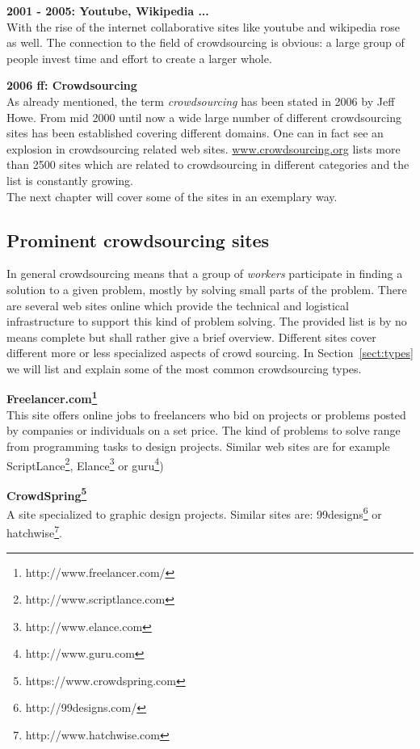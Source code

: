 \documentclass{acm_proc_article-sp}
\begin{document}
\textbf{2001 - 2005: Youtube, Wikipedia ...}\\
With the rise of the internet collaborative sites like youtube and wikipedia rose as well. The connection to the field of crowdsourcing is obvious: a large group of people invest time and effort to create a larger whole.

\textbf{2006 ff: Crowdsourcing}\\
As already mentioned, the term \textit{crowdsourcing} has been stated in 2006 by Jeff Howe. From mid 2000 until now a wide large number of different crowdsourcing sites has been established covering different domains. One can in fact see an explosion in crowdsourcing related web sites. \href{http://www.crowdsourcing.org/directory}{www.crowdsourcing.org} lists more than 2500 sites which are related to crowdsourcing in different categories and the list is constantly growing.\\
The next chapter will cover some of the sites in an exemplary way.

\subsection{Prominent crowdsourcing sites}
In general crowdsourcing means that a group of \textit{workers} participate in finding a solution to a given problem, mostly by solving small parts of the problem. There are several web sites online which provide the technical and logistical infrastructure to support this kind of problem solving. The provided list is by no means complete but shall rather give a brief overview. Different sites cover different more or less specialized aspects of crowd sourcing. In Section~\ref{sect:types} we will list and explain some of the most common crowdsourcing types.

\textbf{Freelancer.com\footnote{http://www.freelancer.com/}}\\
This site offers online jobs to freelancers who bid on projects or problems posted by companies or individuals on a set price. The kind of problems to solve range from programming tasks to design projects. Similar web sites are for example ScriptLance\footnote{http://www.scriptlance.com}, Elance\footnote{http://www.elance.com} or guru\footnote{http://www.guru.com})

\textbf{CrowdSpring\footnote{https://www.crowdspring.com}}\\
A site specialized to graphic design projects. Similar sites are: 99designs\footnote{http://99designs.com/} or hatchwise\footnote{http://www.hatchwise.com}.
\end{document}
